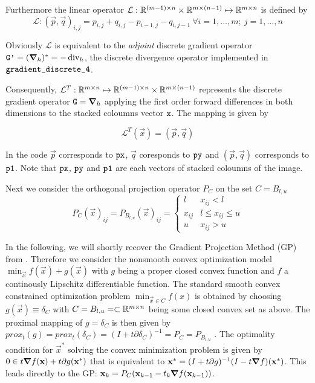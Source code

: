 Furthermore the linear operator $\mathcal{L}: \mathbb{R}^{(m-1) \times n} \times \mathbb{R}^{m \times (n-1)} \mapsto \mathbb{R}^{m \times n}$ is defined by
\begin{equation}
    \mathcal{L}:(\vec{p},\vec{q})_{i,j} = p_{i,j} + q_{i,j} - p_{i-1,j} - q_{i,j-1} \ \forall i=1,\ldots,m; \ j=1,\ldots,n
\end{equation}

Obviously $\mathcal{L}$ is equivalent to the \textit{adjoint} discrete gradient operator $\code{G'} = (\grad{}{h})^* = -\div{}{h}$, the discrete divergence operator implemented in $\texttt{gradient\_discrete\_4}$.

Consequently, $\mathcal{L}^T: \mathbb{R}^{m \times n} \mapsto \mathbb{R}^{(m-1) \times n} \times \mathbb{R}^{m \times (n-1)}$ represents the discrete gradient operator $\code{G} = \grad{}{h}$ applying the first order forward differences in both dimensions to the stacked coloumns vector $\texttt{x}$. The mapping is given by

\begin{equation}
    \mathcal{L}^T(\vec{x}) = (\vec{p},\vec{q})
\end{equation}

In the code $\vec{p}$ corresponds to $\texttt{px}$, $\vec{q}$ coresponds to $\texttt{py}$ and $(\vec{p},\vec{q})$ corresponds to $\texttt{p1}$. Note that $\texttt{px}$, $\texttt{py}$ and $\texttt{p1}$ are each vectors of stacked coloumns of the image.

Next we consider the orthogonal projection operator $P_C$ on the set $C = B_{l,u}$
\begin{equation}
    P_C(\vec{x})_{ij} = P_{B_{l,u}}(\vec{x})_{ij} =
    \begin{cases}
        l &x_{ij} < l\\
        x_{ij} &l \leq x_{ij} \leq u\\
        u &x_{ij} > u
    \end{cases}
\end{equation}

In the following, we will shortly recover the Gradient Projection Method (GP) from \cite[III-B]{MR2722312}. Therefore we consider the nonsmooth convex optimization model $\min_{\vec{x}} f(\vec{x}) + g(\vec{x})$ with $g$ being a proper closed convex function and $f$ a continously Lipschitz differentiable function. The standard smooth convex constrained optimization problem $\min_{\vec{x} \in C} f(x)$ is obtained by choosing $g(\vec{x}) \equiv \delta_C$ with $C = B_{l,u} = \subset \mathbb{R}^{m \times n}$ being some closed convex set as above. The proximal mapping of $g = \delta_C$ is then given by $prox_t(g) = prox_t(\delta_C) = (I + t \partial \delta_C)^{-1} = P_C = P_{B_{l,u}}$ . The optimality condition for $\vec{x}^*$ solving the convex minimization problem is given by $0 \in t \grad{f}(\vec{x}) + t \partial g(\vec{x}^*)$ that is equivalent to $\vec{x}^* = (I + t \partial g)^{-1}(I - t \grad{f})(\vec{x}^*)$. This leads directly to the GP: $\vec{x}_k = P_C(\vec{x}_{k-1}-t_k \grad{f}(\vec{x}_{k-1}))$.

